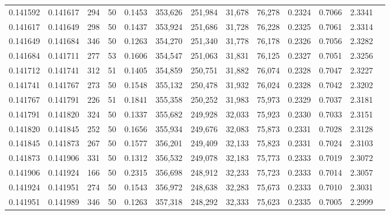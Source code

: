 \begin{tabular}{rrrrrrrrrrrrr}
0.141592 & 0.141617 &   294 &  50 &                                     0.1453 & 353,626 & 251,984 &  31,678 &  76,278 & 0.2324 & 0.7066 & 2.3341 \\
0.141617 & 0.141649 &   298 &  50 &                                     0.1437 & 353,924 & 251,686 &  31,728 &  76,228 & 0.2325 & 0.7061 & 2.3314 \\
0.141649 & 0.141684 &   346 &  50 &                                     0.1263 & 354,270 & 251,340 &  31,778 &  76,178 & 0.2326 & 0.7056 & 2.3282 \\
0.141684 & 0.141711 &   277 &  53 &                                     0.1606 & 354,547 & 251,063 &  31,831 &  76,125 & 0.2327 & 0.7051 & 2.3256 \\
0.141712 & 0.141741 &   312 &  51 &                                     0.1405 & 354,859 & 250,751 &  31,882 &  76,074 & 0.2328 & 0.7047 & 2.3227 \\
0.141741 & 0.141767 &   273 &  50 &                                     0.1548 & 355,132 & 250,478 &  31,932 &  76,024 & 0.2328 & 0.7042 & 2.3202 \\
0.141767 & 0.141791 &   226 &  51 &                                     0.1841 & 355,358 & 250,252 &  31,983 &  75,973 & 0.2329 & 0.7037 & 2.3181 \\
0.141791 & 0.141820 &   324 &  50 &                                     0.1337 & 355,682 & 249,928 &  32,033 &  75,923 & 0.2330 & 0.7033 & 2.3151 \\
0.141820 & 0.141845 &   252 &  50 &                                     0.1656 & 355,934 & 249,676 &  32,083 &  75,873 & 0.2331 & 0.7028 & 2.3128 \\
0.141845 & 0.141873 &   267 &  50 &                                     0.1577 & 356,201 & 249,409 &  32,133 &  75,823 & 0.2331 & 0.7024 & 2.3103 \\
0.141873 & 0.141906 &   331 &  50 &                                     0.1312 & 356,532 & 249,078 &  32,183 &  75,773 & 0.2333 & 0.7019 & 2.3072 \\
0.141906 & 0.141924 &   166 &  50 &                                     0.2315 & 356,698 & 248,912 &  32,233 &  75,723 & 0.2333 & 0.7014 & 2.3057 \\
0.141924 & 0.141951 &   274 &  50 &                                     0.1543 & 356,972 & 248,638 &  32,283 &  75,673 & 0.2333 & 0.7010 & 2.3031 \\
0.141951 & 0.141989 &   346 &  50 &                                     0.1263 & 357,318 & 248,292 &  32,333 &  75,623 & 0.2335 & 0.7005 & 2.2999 \\

\end{tabular}
